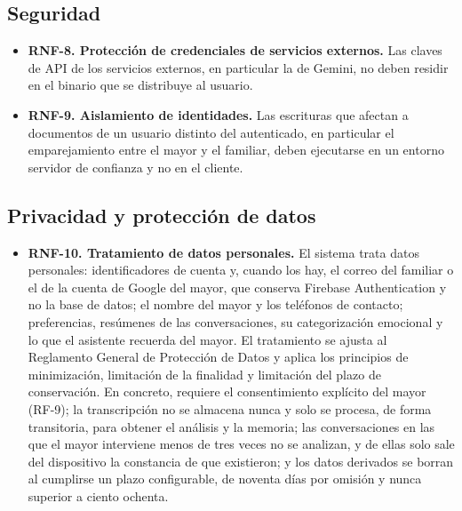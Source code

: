 \subsection*{Seguridad}
\begin{itemize}
    \item \textbf{RNF-8. Protección de credenciales de servicios externos.} Las claves de API de los servicios externos, en particular la de Gemini, no deben residir en el binario que se distribuye al usuario.
    \item \textbf{RNF-9. Aislamiento de identidades.} Las escrituras que afectan a documentos de un usuario distinto del autenticado, en particular el emparejamiento entre el mayor y el familiar, deben ejecutarse en un entorno servidor de confianza y no en el cliente.
\end{itemize}

\subsection*{Privacidad y protección de datos}
\begin{itemize}
    \item \textbf{RNF-10. Tratamiento de datos personales.} El sistema trata datos personales: identificadores de cuenta y, cuando los hay, el correo del familiar o el de la cuenta de Google del mayor, que conserva Firebase Authentication y no la base de datos; el nombre del mayor y los teléfonos de contacto; preferencias, resúmenes de las conversaciones, su categorización emocional y lo que el asistente recuerda del mayor. El tratamiento se ajusta al Reglamento General de Protección de Datos \citep{RGPD2016} y aplica los principios de minimización, limitación de la finalidad y limitación del plazo de conservación. En concreto, requiere el consentimiento explícito del mayor (RF-9); la transcripción no se almacena nunca y solo se procesa, de forma transitoria, para obtener el análisis y la memoria; las conversaciones en las que el mayor interviene menos de tres veces no se analizan, y de ellas solo sale del dispositivo la constancia de que existieron; y los datos derivados se borran al cumplirse un plazo configurable, de noventa días por omisión y nunca superior a ciento ochenta.
\end{itemize}

